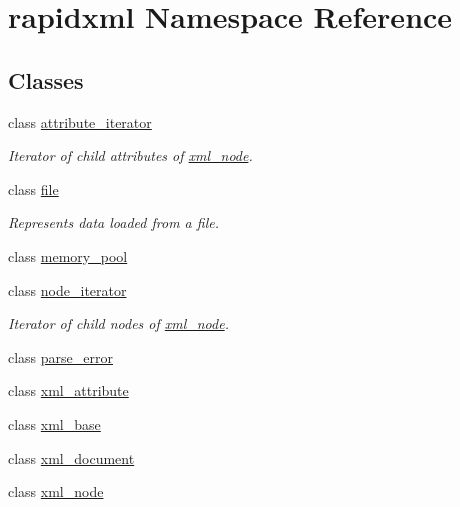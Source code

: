 \hypertarget{namespacerapidxml}{}\section{rapidxml Namespace Reference}
\label{namespacerapidxml}
\subsection*{Classes}
\begin{DoxyCompactItemize}
\item 
class \mbox{\hyperlink{classrapidxml_1_1attribute__iterator}{attribute\+\_\+iterator}}
\begin{DoxyCompactList}\small\item\em Iterator of child attributes of \mbox{\hyperlink{classrapidxml_1_1xml__node}{xml\+\_\+node}}. \end{DoxyCompactList}\item 
class \mbox{\hyperlink{classrapidxml_1_1file}{file}}
\begin{DoxyCompactList}\small\item\em Represents data loaded from a file. \end{DoxyCompactList}\item 
class \mbox{\hyperlink{classrapidxml_1_1memory__pool}{memory\+\_\+pool}}
\item 
class \mbox{\hyperlink{classrapidxml_1_1node__iterator}{node\+\_\+iterator}}
\begin{DoxyCompactList}\small\item\em Iterator of child nodes of \mbox{\hyperlink{classrapidxml_1_1xml__node}{xml\+\_\+node}}. \end{DoxyCompactList}\item 
class \mbox{\hyperlink{classrapidxml_1_1parse__error}{parse\+\_\+error}}
\item 
class \mbox{\hyperlink{classrapidxml_1_1xml__attribute}{xml\+\_\+attribute}}
\item 
class \mbox{\hyperlink{classrapidxml_1_1xml__base}{xml\+\_\+base}}
\item 
class \mbox{\hyperlink{classrapidxml_1_1xml__document}{xml\+\_\+document}}
\item 
class \mbox{\hyperlink{classrapidxml_1_1xml__node}{xml\+\_\+node}}
\end{DoxyCompactItemize}
